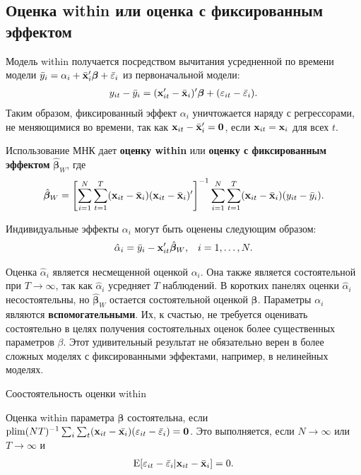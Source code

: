 \subsection{Оценка within или оценка с фиксированным эффектом}

Модель within получается посредством вычитания усредненной по времени модели $\bar{y}_i=\alpha_i+\bar{\mathbf{x}}'_i\bm\beta +\bar{\varepsilon}_i$ из первоначальной модели:
\begin{align}
y_{it}-\bar{y}_i=(\mathbf{x}'_{it}-\bar{\mathbf{x}}_i)'\bm\beta +(\varepsilon_{it}-\bar{\varepsilon}_i).
\label{Eq:21.23}
\end{align}
Таким образом, фиксированный эффект $\alpha_i$ уничтожается наряду с регрессорами, не меняющимися во времени, так как $\mathbf{x}_{it}-\bar{\mathbf{x}}'_i=\mathbf 0$, если $\mathbf{x}_{it}=\mathbf{x}_i$ для всех $t$.

Использование МНК дает \textbf{оценку within} или \textbf{оценку с фиксированным эффектом} $\hat{\bm\beta}_W$, где 
\begin{align}
\hat{\bm\beta}_W=\left[ \sum^N_{i=1} \sum^T_{t=1} (\mathbf{x}_{it}-\bar{\mathbf{x}}_i)(\mathbf{x}_{it}-\bar{\mathbf{x}}_i)'\right]^{-1} \sum^N_{i=1} \sum^T_{t=1} (\mathbf{x}_{it}-\bar{\mathbf{x}}_i)(y_{it}-\bar{y}_i).
\label{Eq:21.24}
\end{align}

 Индивидуальные эффекты $\alpha_i$ могут быть оценены следующим образом:
\begin{align}
&\hat{\alpha}_i=\bar{y}_i-\mathbf{x}'_{it}\hat{\bm\beta}_W, & i=1, \dots, N.
\label{Eq:21.25}
\end{align}

Оценка $\hat{\alpha}_i$ является несмещенной оценкой $\alpha_i$. Она также является состоятельной при $T \rightarrow \infty$, так как $\hat{\alpha}_i$ усредняет $T$  наблюдений. В коротких панелях оценки $\hat{\alpha}_i$ несостоятельны, но $\hat{\bm\beta}_W$ остается состоятельной оценкой $\bm\beta$. Параметры  $\alpha_i$ являются \textbf{вспомогательными}. Их, к счастью, не требуется оценивать состоятельно в целях получения состоятельных оценок более существенных параметров $\beta$. Этот удивительный результат не обязательно верен  в более сложных моделях с фиксированными эффектами, например, в нелинейных моделях.

{\centering
Соостоятельность оценки within\\}

Оценка within параметра $\bm\beta$ состоятельна, если  $\mathrm{plim}(NT)^{-1}\sum_i\sum_t(\mathbf{x}_{it}-\bar{\mathbf{x}_i})(\varepsilon_{it}-\bar{\varepsilon}_i)=\mathbf 0$. Это выполняется, если $N \rightarrow \infty$ или $T \rightarrow \infty$ и 
\begin{align}
\mathrm E[\varepsilon_{it}-\bar{\varepsilon}_i|\mathbf{x}_{it}-\bar{\mathbf{x}}_i]=0.
\label{Eq:21.26}
\end{align}
 
